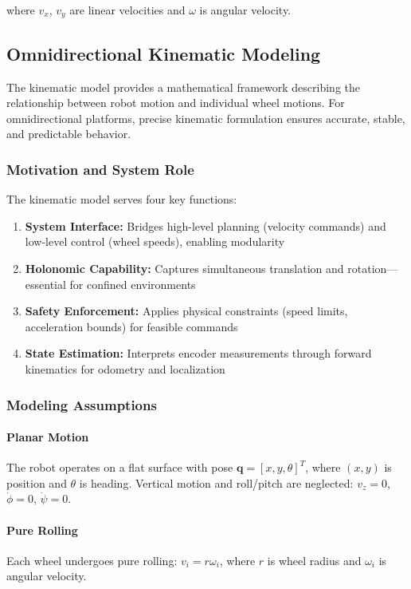 where $v_x$, $v_y$ are linear velocities and $\omega$ is angular velocity.

\subsection{Omnidirectional Kinematic Modeling}
\label{subsec:omni_driver}

The kinematic model provides a mathematical framework describing the relationship between robot motion and individual wheel motions. For omnidirectional platforms, precise kinematic formulation ensures accurate, stable, and predictable behavior.

\subsubsection{Motivation and System Role}

The kinematic model serves four key functions:
\begin{enumerate}
    \item \textbf{System Interface:} Bridges high-level planning (velocity commands) and low-level control (wheel speeds), enabling modularity
    \item \textbf{Holonomic Capability:} Captures simultaneous translation and rotation---essential for confined environments
    \item \textbf{Safety Enforcement:} Applies physical constraints (speed limits, acceleration bounds) for feasible commands
    \item \textbf{State Estimation:} Interprets encoder measurements through forward kinematics for odometry and localization
\end{enumerate}

\subsubsection{Modeling Assumptions}

\paragraph{Planar Motion}
The robot operates on a flat surface with pose $\mathbf{q} = [x, y, \theta]^T$, where $(x, y)$ is position and $\theta$ is heading. Vertical motion and roll/pitch are neglected: $v_z = 0$, $\dot{\phi} = 0$, $\dot{\psi} = 0$.

\paragraph{Pure Rolling}
Each wheel undergoes pure rolling: $v_i = r \omega_i$, where $r$ is wheel radius and $\omega_i$ is angular velocity.

